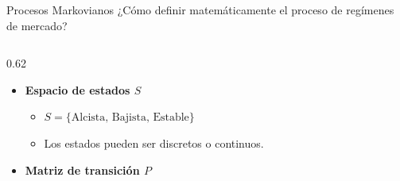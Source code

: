 \documentclass[xcolor=dvipsnames]{beamer}
\begin{document}
\begin{frame}{Procesos Markovianos}
¿Cómo definir matemáticamente el proceso de regímenes de mercado?

\begin{columns}[t]
    \begin{column}{0.62\textwidth}
        \begin{itemize}
            \item<2-> \textbf{Espacio de estados $S$}
            \begin{itemize}
                \item $S = \{\text{Alcista, Bajista, Estable}\}$
                \item Los estados pueden ser discretos o continuos.
            \end{itemize}
            
            \item<3-> \textbf{Matriz de transición $P$}
            
        \end{itemize}
    \end{column}


\end{columns}
\end{frame}
\end{document}
